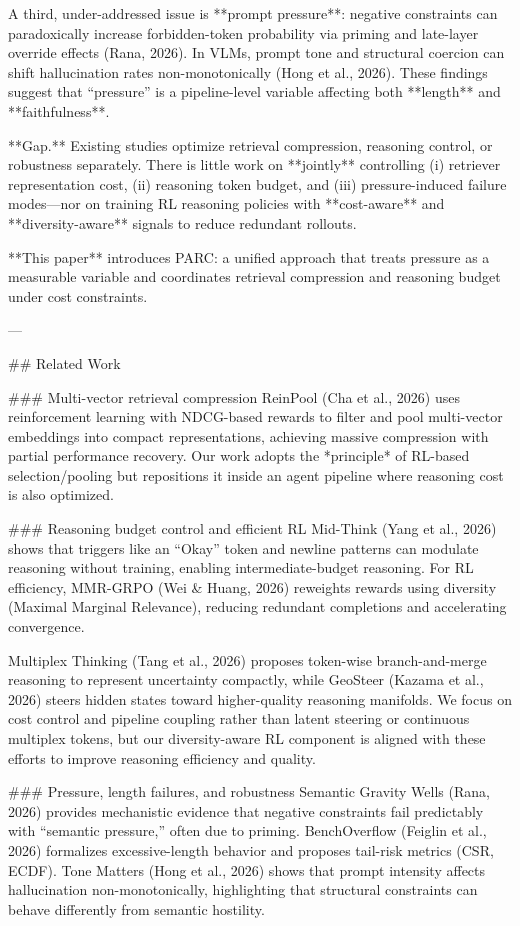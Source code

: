 A third, under-addressed issue is **prompt pressure**: negative constraints can paradoxically increase forbidden-token probability via priming and late-layer override effects (Rana, 2026). In VLMs, prompt tone and structural coercion can shift hallucination rates non-monotonically (Hong et al., 2026). These findings suggest that “pressure” is a pipeline-level variable affecting both **length** and **faithfulness**.

**Gap.** Existing studies optimize retrieval compression, reasoning control, or robustness separately. There is little work on **jointly** controlling (i) retriever representation cost, (ii) reasoning token budget, and (iii) pressure-induced failure modes—nor on training RL reasoning policies with **cost-aware** and **diversity-aware** signals to reduce redundant rollouts.

**This paper** introduces PARC: a unified approach that treats pressure as a measurable variable and coordinates retrieval compression and reasoning budget under cost constraints.

---

## Related Work  

### Multi-vector retrieval compression  
ReinPool (Cha et al., 2026) uses reinforcement learning with NDCG-based rewards to filter and pool multi-vector embeddings into compact representations, achieving massive compression with partial performance recovery. Our work adopts the *principle* of RL-based selection/pooling but repositions it inside an agent pipeline where reasoning cost is also optimized.

### Reasoning budget control and efficient RL  
Mid-Think (Yang et al., 2026) shows that triggers like an “Okay” token and newline patterns can modulate reasoning without training, enabling intermediate-budget reasoning. For RL efficiency, MMR-GRPO (Wei & Huang, 2026) reweights rewards using diversity (Maximal Marginal Relevance), reducing redundant completions and accelerating convergence.

Multiplex Thinking (Tang et al., 2026) proposes token-wise branch-and-merge reasoning to represent uncertainty compactly, while GeoSteer (Kazama et al., 2026) steers hidden states toward higher-quality reasoning manifolds. We focus on cost control and pipeline coupling rather than latent steering or continuous multiplex tokens, but our diversity-aware RL component is aligned with these efforts to improve reasoning efficiency and quality.

### Pressure, length failures, and robustness  
Semantic Gravity Wells (Rana, 2026) provides mechanistic evidence that negative constraints fail predictably with “semantic pressure,” often due to priming. BenchOverflow (Feiglin et al., 2026) formalizes excessive-length behavior and proposes tail-risk metrics (CSR, ECDF). Tone Matters (Hong et al., 2026) shows that prompt intensity affects hallucination non-monotonically, highlighting that structural constraints can behave differently from semantic hostility.

